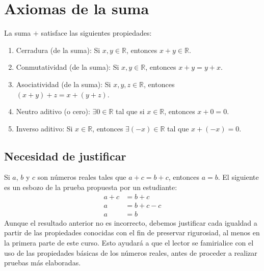 \documentclass[11pt]{article}
\newcommand{\R}{\mathbb{R}}
\begin{document}
\section*{Axiomas de la suma}
La suma $+$ satisface las siguientes propiedades:
\begin{enumerate}%
    \item Cerradura (de la suma): Si $x,y\in \R$, entonces $x+y \in \R$.

    \item Conmutatividad (de la suma): Si $x, y\in \R$, entonces $x+y =y+x$.

    \item Asociatividad (de la suma): Si $x, y, z\in \R$, entonces $(x+y)+z = x+(y+z)$.
    \item Neutro aditivo (o cero): $\exists 0\in \R$ tal que si $x\in \R$, entonces $x+0=0$.
    \item Inverso aditivo: Si $x\in \R$, entonces $\exists (-x)\in \R$ tal que $x+(-x)=0$.
\end{enumerate}

\subsection*{Necesidad de justificar}

Si $a$, $b$ y $c$ son números reales tales que $a+c=b+c$, entonces $a=b$. El siguiente es un esbozo de la prueba propuesta por un estudiante: \begin{align*}
    a+c &= b+c\\
    a &= b+c-c\\
    a &= b \end{align*}
Aunque el resultado anterior no es incorrecto, debemos justificar cada igualdad a partir de las propiedades conocidas con el fin de preservar rigurosiad, al menos en la primera parte de este curso. Esto ayudará a que el lector se famirialice con el uso de las propiedades básicas de los números reales, antes de proceder a realizar pruebas más elaboradas.
\end{document}
